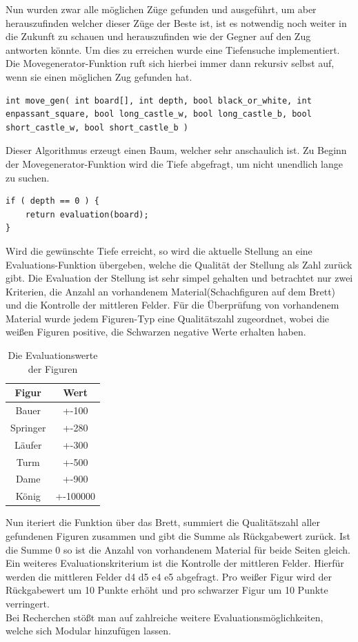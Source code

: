 \documentclass[a4paper, 12pt]{article}
\begin{document}
Nun wurden zwar alle möglichen Züge gefunden und ausgeführt, um aber herauszufinden welcher dieser Züge der Beste ist, ist es notwendig noch weiter in die Zukunft zu schauen und herauszufinden wie der Gegner auf den Zug antworten könnte.
Um dies zu erreichen wurde eine Tiefensuche implementiert. Die Movegenerator-Funktion ruft sich hierbei immer dann rekursiv selbst auf, wenn sie einen möglichen Zug gefunden hat.


\begin{lstlisting}
int move_gen( int board[], int depth, bool black_or_white, int enpassant_square, bool long_castle_w, bool long_castle_b, bool short_castle_w, bool short_castle_b )
\end{lstlisting}

Dieser Algorithmus erzeugt einen Baum, welcher sehr anschaulich ist.
Zu Beginn der Movegenerator-Funktion wird die Tiefe abgefragt, um nicht unendlich lange zu suchen.

\begin{lstlisting}
if ( depth == 0 ) {
    return evaluation(board);
}
\end{lstlisting}

Wird die gewünschte Tiefe erreicht, so wird die aktuelle Stellung an eine Evaluations-Funktion übergeben, welche die Qualität der Stellung als Zahl zurück gibt.
Die Evaluation der Stellung ist sehr simpel gehalten und betrachtet nur zwei Kriterien, die Anzahl an vorhandenem Material(Schachfiguren auf dem Brett) und die Kontrolle der mittleren Felder. 
Für die Überprüfung von vorhandenem Material wurde jedem Figuren-Typ eine Qualitätszahl zugeordnet, wobei die weißen Figuren positive, die Schwarzen negative Werte erhalten haben.

\begin{table}[h!]
\centering
\begin{tabular}{|| c | c ||} 
 \hline
 Figur & Wert \\
 \hline\hline
 Bauer & +-100  \\ 
 Springer & +-280  \\
 Läufer & +-300  \\
 Turm & +-500  \\
 Dame & +-900  \\
 König & +-100000  \\
 \hline
\end{tabular}
\caption{Die Evaluationswerte der Figuren}
\label{evaluation}
\end{table}

Nun iteriert die Funktion über das Brett, summiert die Qualitätszahl aller gefundenen Figuren zusammen und gibt die Summe als Rückgabewert zurück. Ist die Summe 0 so ist die Anzahl von vorhandenem Material für beide Seiten gleich.\\
Ein weiteres Evaluationskriterium ist die Kontrolle der mittleren Felder.
Hierfür werden die mittleren Felder d4 d5 e4 e5 abgefragt. Pro weißer Figur wird der Rückgabewert um 10 Punkte erhöht und pro schwarzer Figur um 10 Punkte verringert.\\
Bei Recherchen stößt man auf zahlreiche weitere Evaluationsmöglichkeiten, welche sich Modular hinzufügen lassen.\\
\end{document}
